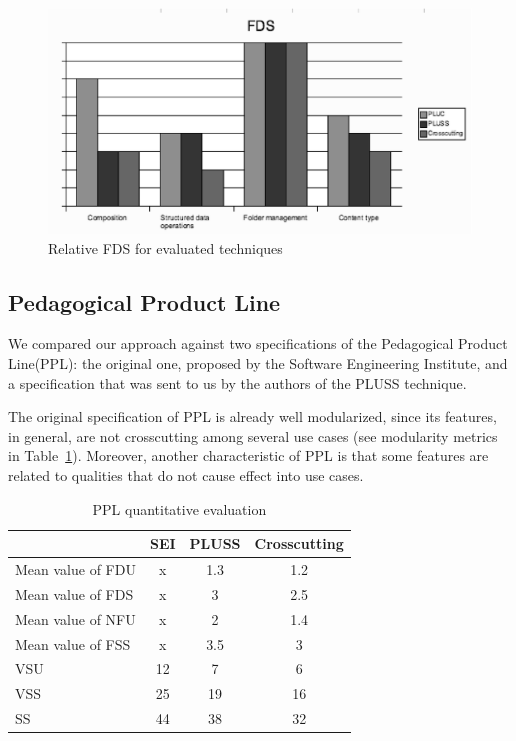 \documentclass{acm_proc_article-sp}
\begin{document}
{ \begin{figure}[h]
 \begin{center}
  \includegraphics[scale=0.35]{img/fds-mms.eps}
  \caption{Relative FDS for evaluated techniques}
  \label{fig:fds-mms}
  \end{center}
\end{figure}
  
\subsection{Pedagogical Product Line}

We compared our approach against two specifications of the Pedagogical Product Line(PPL): the original one, proposed by the Software Engineering Institute, and a specification that was sent to us by the authors of the PLUSS technique. 

The original specification of PPL is already well modularized, since its features, in general, are not crosscutting among several use cases (see modularity metrics in Table~\ref{tab:ppl-metrics}). Moreover, another characteristic of PPL is that some features are related to qualities that do not cause effect into use cases. 

\begin{table}[hb]
\centering
\caption{PPL quantitative evaluation}
\label{tab:ppl-metrics}
\begin{small}
\begin{tabular}{lccc} \hline
					& SEI 	& PLUSS 	& Crosscutting	\\ \hline
Mean value of FDU 		& x		& 1.3	& 1.2	\\
Mean value of FDS 		& x		& 3		& 2.5	\\
Mean value of NFU 		& x		& 2		& 1.4	\\
Mean value of FSS 		& x		& 3.5	& 3		\\ 
VSU 					& 12		& 7		& 6		\\
VSS 					& 25		& 19		& 16		\\
SS 					& 44		& 38		& 32		\\	\hline
\end{tabular}
\end{small}
\end{table}

}
\end{document}
